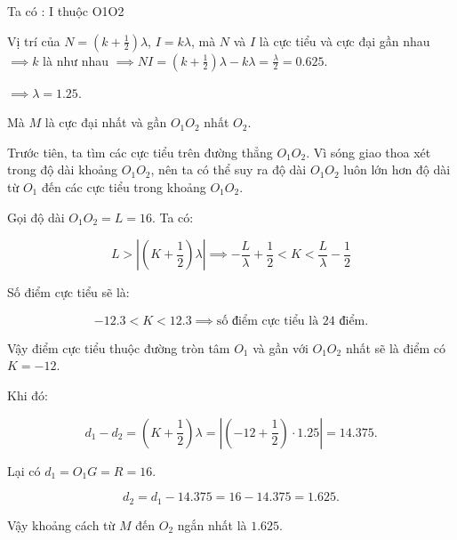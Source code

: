\documentclass{article}
\begin{document}
Ta có : I thuộc O1O2 

Vị trí của $N = \left(k + \frac{1}{2}\right) \lambda$, $I = k \lambda$, mà $N$ và $I$ là cực tiểu và cực đại gần nhau $\implies k$ là như nhau $\implies NI = \left(k + \frac{1}{2}\right) \lambda - k \lambda = \frac{\lambda}{2} = 0.625$.

$\implies \lambda = 1.25$.

Mà $M$ là cực đại nhất và gần $O_1 O_2$ nhất $O_2$.

Trước tiên, ta tìm các cực tiểu trên đường thẳng $O_1 O_2$. Vì sóng giao thoa xét trong độ dài khoảng $O_1 O_2$, nên ta có thể suy ra độ dài $O_1 O_2$ luôn lớn hơn độ dài từ $O_1$ đến các cực tiểu trong khoảng $O_1 O_2$.

Gọi độ dài $O_1 O_2 = L = 16$. Ta có:

\[
L > \left| \left(K + \frac{1}{2}\right) \lambda \right| \implies -\frac{L}{\lambda} + \frac{1}{2} < K < \frac{L}{\lambda} - \frac{1}{2}
\]

Số điểm cực tiểu sẽ là:

\[
-12.3 < K < 12.3 \implies \text{số điểm cực tiểu là } 24 \text{ điểm}.
\]

Vậy điểm cực tiểu thuộc đường tròn tâm $O_1$ và gần với $O_1 O_2$ nhất sẽ là điểm có $K = -12$.

Khi đó:

\[
d_1 - d_2 = \left(K + \frac{1}{2}\right) \lambda = \left|(-12 + \frac{1}{2}) \cdot 1.25\right| = 14.375.
\]

Lại có $d_1 = O_1 G = R = 16$.

\[
d_2 = d_1 - 14.375 = 16 - 14.375 = 1.625.
\]

Vậy khoảng cách từ $M$ đến $O_2$ ngắn nhất là $1.625$.
\end{document}

